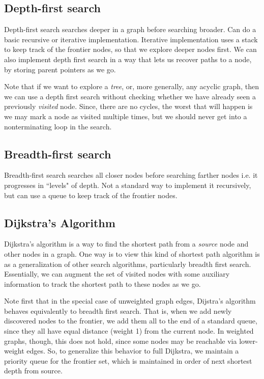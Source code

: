 \documentclass[10pt,a4paper]{article}
\begin{document}
\subsection{Depth-first search}
Depth-first search searches deeper in a graph before searching broader. Can do a basic recursive or iterative implementation. Iterative implementation uses a stack to keep track of the frontier nodes, so that we explore deeper nodes first. We can also implement depth first search in a way that lets us recover paths to a node, by storing parent pointers as we go.

Note that if we want to explore a \textit{tree}, or, more generally, any acyclic graph, then we can use a depth first search without checking whether we have already seen a previously \textit{visited} node. Since, there are no cycles, the worst that will happen is we may mark a node as visited multiple times, but we should never get into a nonterminating loop in the search.

\subsection{Breadth-first search}
Breadth-first search searches all closer nodes before searching farther nodes i.e. it progresses in ``levels" of depth. Not a standard way to implement it recursively, but can use a queue to keep track of the frontier nodes.

\subsection{Dijkstra's Algorithm}

Dijkstra's algorithm is a way to find the shortest path from a \textit{source} node and other nodes in a graph. One way is to view this kind of shortest path algorithm is as a generalization of other search algorithms, particularly breadth first search. Essentially, we can augment the set of visited nodes with some auxiliary information to track the shortest path to these nodes as we go. 

Note first that in the special case of unweighted graph edges, Dijstra's algorithm behaves equivalently to breadth first search. That is, when we add newly discovered nodes to the frontier, we add them all to the end of a standard queue, since they all have equal distance (weight 1) from the current node. In weighted graphs, though, this does not hold, since some nodes may be reachable via lower-weight edges. So, to generalize this behavior to full Dijkstra, we maintain a priority queue for the frontier set, which is maintained in order of next shortest depth from source.
\end{document}
